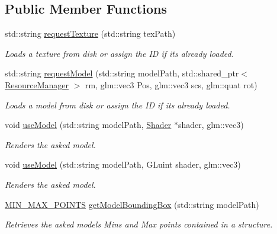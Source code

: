 \subsection*{Public Member Functions}
\begin{DoxyCompactItemize}
\item 
std\+::string \hyperlink{class_resource_manager_a3d5f5a1f1ba52642b5e39b0c51c970f7}{request\+Texture} (std\+::string tex\+Path)
\begin{DoxyCompactList}\small\item\em Loads a texture from disk or assign the ID if it\textquotesingle{}s already loaded. \end{DoxyCompactList}\item 
std\+::string \hyperlink{class_resource_manager_a957b2daa207d299545d210fb2afc1049}{request\+Model} (std\+::string model\+Path, std\+::shared\+\_\+ptr$<$ \hyperlink{class_resource_manager}{Resource\+Manager} $>$ rm, glm\+::vec3 Pos, glm\+::vec3 scs, glm\+::quat rot)
\begin{DoxyCompactList}\small\item\em Loads a model from disk or assign the ID if it\textquotesingle{}s already loaded. \end{DoxyCompactList}\item 
void \hyperlink{class_resource_manager_a4a1e37445897a89d4b07a3490d0ba2ce}{use\+Model} (std\+::string model\+Path, \hyperlink{class_shader}{Shader} $\ast$shader, glm\+::vec3)
\begin{DoxyCompactList}\small\item\em Renders the asked model. \end{DoxyCompactList}\item 
void \hyperlink{class_resource_manager_a0572626be5a022c000afd417c72d851b}{use\+Model} (std\+::string model\+Path, G\+Luint shader, glm\+::vec3)
\begin{DoxyCompactList}\small\item\em Renders the asked model. \end{DoxyCompactList}\item 
\hyperlink{struct_m_i_n___m_a_x___p_o_i_n_t_s}{M\+I\+N\+\_\+\+M\+A\+X\+\_\+\+P\+O\+I\+N\+TS} \hyperlink{class_resource_manager_a97368ca128405495ccf1325b7df5f846}{get\+Model\+Bounding\+Box} (std\+::string model\+Path)
\begin{DoxyCompactList}\small\item\em Retrieves the asked model\textquotesingle{}s Mins and Max points contained in a structure. \end{DoxyCompactList}\item 

\end{DoxyCompactItemize}
